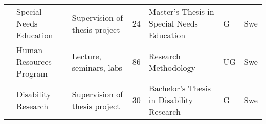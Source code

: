 \documentclass[]{article}
\begin{document}
\begin{landscape}
\begin{ThreePartTable}
\begin{longtable}[t]{l>{\raggedright\arraybackslash}p{5cm}>{\raggedright\arraybackslash}p{5cm}l>{\raggedright\arraybackslash}p{5cm}ll}
 & Special Needs Education & Supervision of thesis project & 24 & Master's Thesis in Special Needs Education & G & Swe\\
 & Human Resources Program & Lecture, seminars, labs & 86 & Research Methodology & UG & Swe\\
 & Disability Research & Supervision of thesis project & 30 & Bachelor's Thesis in Disability Research & G & Swe\\*
\end{longtable}
\end{ThreePartTable}
\end{landscape}
\end{document}
